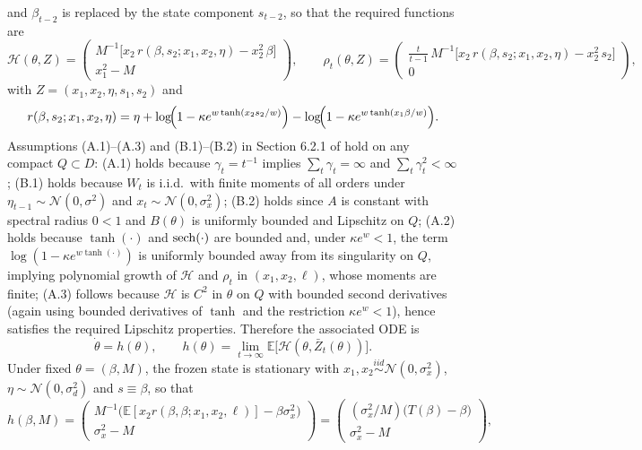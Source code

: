 and $\beta_{t-2}$ is replaced by the state component $s_{t-2}$, so that the required functions are
\[
\mathcal H(\theta,Z)=
\begin{pmatrix}
M^{-1}\big[x_{2}\,r(\beta,s_{2};x_1,x_2,\eta)-x_2^2\,\beta\big]\\
x_1^2-M
\end{pmatrix},
\qquad
\rho_t(\theta,Z)=
\begin{pmatrix}
\frac{t}{t-1}\,M^{-1}\big[x_{2}\,r(\beta,s_{2};x_1,x_2,\eta)-x_2^2\,s_{2}\big]\\
0
\end{pmatrix},
\]
with $Z=(x_1,x_2,\eta,s_1, s_2)$ and
\[
r(\beta,s_2;x_1,x_2,\eta)
=\eta+\log\!\Bigl(1-\kappa e^{w\tanh(x_2 s_2/w)}\Bigr)-\log\!\Bigl(1-\kappa e^{w\tanh(x_1 \beta/w)}\Bigr).
\]
Assumptions (A.1)–(A.3) and (B.1)–(B.2) in Section 6.2.1 of \cite{GeorgeWEvans2001} hold on any compact $Q\subset D$: (A.1) holds because $\gamma_t=t^{-1}$ implies $\sum_t\gamma_t=\infty$ and $\sum_t\gamma_t^2<\infty$; 
(B.1) holds because $W_t$ is i.i.d.\ with finite moments of all orders under $\eta_{t-1}\sim\mathcal N(0,\sigma^2)$ and $x_t\sim \mathcal N(0,\sigma_x^2)$; (B.2) holds since $A$ is constant with spectral radius $0<1$ and $B(\theta)$ is uniformly bounded and Lipschitz on $Q$; (A.2) holds because $\tanh(\cdot)$ and $\operatorname*{sech}(\cdot)$ are bounded and, under $\kappa e^{w}<1$, the term $\log(1-\kappa e^{w\tanh(\cdot)})$ is uniformly bounded away from its singularity on $Q$, implying polynomial growth of $\mathcal H$ and $\rho_t$ in $(x_1,x_2,\ell)$, whose moments are finite; (A.3) follows because $\mathcal H$ is $C^2$ in $\theta$ on $Q$ with bounded second derivatives (again using bounded derivatives of $\tanh$ and the restriction $\kappa e^{w}<1$), hence satisfies the required Lipschitz properties. Therefore the associated ODE is
\[
\dot\theta = h(\theta),\qquad h(\theta)=\lim_{t\to\infty}\mathbb E\big[\mathcal H(\theta,\bar Z_t(\theta))\big].
\]
Under fixed $\theta=(\beta,M)$, the frozen state is stationary with $x_1,x_2\stackrel{iid}{\sim}\mathcal N(0,\sigma_x^2)$, $\eta\sim\mathcal N(0,\sigma_d^2)$ and $s\equiv \beta$, so that
\[
h(\beta,M)=
\begin{pmatrix}
M^{-1}\big(\mathbb E[x_2 r(\beta,\beta;x_1,x_2,\ell)]-\beta\sigma_x^2\big)\\
\sigma_x^2-M
\end{pmatrix}
=
\begin{pmatrix}
(\sigma_x^2/M)\big(T(\beta)-\beta\big)\\
\sigma_x^2-M
\end{pmatrix},
\]
